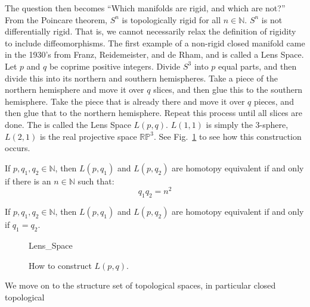 \documentclass[crop=false,class=book,oneside]{standalone}                      %
\begin{document}
            The question then becomes
            ``Which manifolds are rigid, and which are not?''
            From the Poincare theorem, $S^{n}$ is topologically
            rigid for all $n\in\mathbb{N}$. $S^{n}$ is not differentially
            rigid. That is, we cannot necessarily relax the definition
            of rigidity to include diffeomorphisms.
            The first example of a non-rigid closed
            manifold came in the 1930's from Franz, Reidemeister,
            and de Rham, and is called a Lens Space.
            Let $p$ and $q$ be coprime positive integers.
            Divide $S^{3}$ into $p$ equal parts, and then divide
            this into its northern and southern hemispheres.
            Take a piece of the northern hemisphere and move
            it over $q$ slices, and then glue this to the
            southern hemisphere. Take the piece that is already
            there and move it over $q$ pieces, and then glue
            that to the northern hemisphere. Repeat this
            process until all slices are done. The is called
            the Lens Space $L(p,q)$. $L(1,1)$ is simply the
            3-sphere, $L(2,1)$ is the real projective space
            $\mathbb{RP}^{3}$.
            See Fig.~\ref{fig:surgery_theory_lens_space_drawing}
            to see how this construction occurs.
            \begin{theorem}
                If $p,q_{1},q_{2}\in\mathbb{N}$, then $L(p,q_{1})$ and
                $L(p,q_{2})$ are homotopy equivalent if and only if there
                is an $n\in\mathbb{N}$ such that:
                \begin{equation}
                    q_{1}q_{2}=n^{2}
                \end{equation}
            \end{theorem}
            \begin{theorem}
                If $p,q_{1},q_{2}\in\mathbb{N}$, then $L(p,q_{1})$ and
                $L(p,q_{2})$ are homotopy equivalent if and only if
                $q_{1}=q_{2}$.
            \end{theorem}
            \begin{figure}[H]
                \centering
                \captionsetup{type=figure}
                {Lens_Space}
                \caption{How to construct $L(p,q)$.}
                \label{fig:surgery_theory_lens_space_drawing}
            \end{figure}
            We move on to the structure set of topological spaces,
            in particular closed topological
\end{document}
